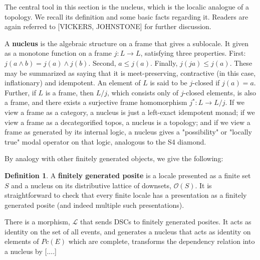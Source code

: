 \documentclass[hoptionsi,review,format=acmsmall]{acmart}
\theoremstyle{definition}
\newtheorem{definition}{Definition}[section]
\newcommand{\Oc}{\mathcal{O}}
\newcommand{\Lc}{\mathcal{L}}
\begin{document}
The central tool in this section is the nucleus, which is the localic analogue of a topology. We recall its definition and some basic facts regarding it. Readers are again referred to [VICKERS, JOHNSTONE] for further discussion.

A \textbf{nucleus} is the algebraic structure on a frame that gives a sublocale. It given as a monotone function on a frame \(j : L \rightarrow L\), satisfying three properties. First: \(j(a \wedge b) = j(a) \wedge j(b)\). Second, \(a \le j(a)\). Finally, \(j(ja) \le j(a)\). These may be summarized as saying that it is meet-preserving, contractive (in this case, inflationary) and idempotent. An element of \(L\) is said to be \(j\)-closed if \(j(a)=a\). Further, if \(L\) is a frame, then \(L/j\), which consists only of \(j\)-closed elements, is also a frame, and there exists a surjective frame homomorphism \(j^* : L \rightarrow L/j\). If we view a frame as a category, a nucleus is just a left-exact idempotent monad; if we view a frame as a decategorified topos, a nucleus is a topology; and if we view a frame as generated by its internal logic, a nucleus gives a "possibility" or "locally true" modal operator on that logic, analogous to the S4 diamond.




By analogy with other finitely generated objects, we give the following:

\begin{definition}
A \textbf{finitely generated posite} is a locale presented as a finite set \(S\) and a nucleus on its distributive lattice of downsets, \(\Oc(S)\). It is straightforward to check that every finite locale has a presentation as a finitely generated posite (and indeed multiple such presentations).
\end{definition}

There is a morphism, \(\Lc\) that sends DSCs to finitely generated posites. It acts as identity on the set of all events, and generates a nucleus that acts as identity on elements of \(Pc(E)\) which are complete,  transforms the dependency relation into a nucleus by [....]

\end{document}
